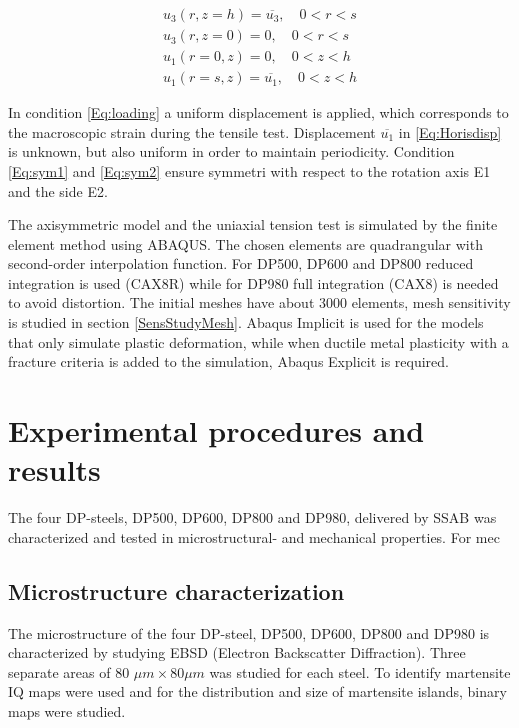 \documentclass{article}
\begin{document}
\begin{subequations}
    \begin{alignat}{4}
        u_3(r,z=h)=\overline{u_3}, \quad 0 < r <s \label{Eq:loading}\\
        u_3(r,z=0)=0, \quad 0 < r <s \label{Eq:sym1}\\
        u_1(r=0,z)=0, \quad 0 < z <h \label{Eq:sym2}\\
        u_1(r=s,z)=\overline{u_1}, \quad 0 < z <h \label{Eq:Horisdisp}
    \end{alignat}
\end{subequations}

In condition \ref{Eq:loading} a uniform displacement is applied, which corresponds to the macroscopic strain during the tensile test. Displacement $\overline{u_1}$ in \ref{Eq:Horisdisp} is unknown, but also uniform in order to maintain periodicity. Condition \ref{Eq:sym1} and \ref{Eq:sym2} ensure symmetri with respect to the rotation axis E1 and the side E2.

The axisymmetric model and the uniaxial tension test is simulated by the finite element method using ABAQUS. The chosen elements are quadrangular with second-order interpolation function.  For DP500, DP600 and DP800 reduced integration is used (CAX8R) while for DP980 full integration (CAX8) is needed to avoid distortion. The initial meshes have about 3000 elements, mesh sensitivity is studied in section \ref{SensStudyMesh}. Abaqus Implicit is used for the models that only simulate plastic deformation, while when ductile metal plasticity with a fracture criteria is added to the simulation, Abaqus Explicit is required. 

\section{Experimental procedures and results}
The four DP-steels, DP500, DP600, DP800 and DP980, delivered by SSAB was characterized and tested in microstructural- and mechanical properties. For mec
\subsection{Microstructure characterization}
The microstructure of the four DP-steel, DP500, DP600, DP800 and DP980 is characterized by studying EBSD (Electron Backscatter Diffraction). Three separate areas of 80 $\mu m \times 80 \mu m$ was studied for each steel. To identify martensite IQ maps were used and for the distribution and size of martensite islands, binary maps were studied.
\end{document}
